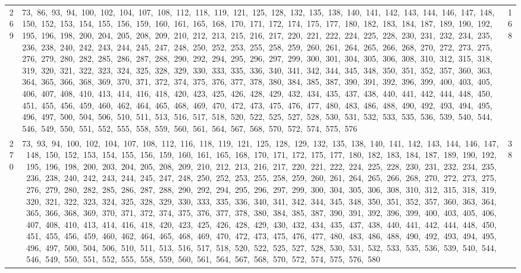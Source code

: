 \begin{longtable}{c|p{}|r}
269 & 73,\ 86,\ 93,\ 94,\ 100,\ 102,\ 104,\ 107,\ 108,\ 112,\ 118,\ 119,\ 121,\ 125,\ 128,\ 132,\ 135,\ 138,\ 140,\ 141,\ 142,\ 143,\ 144,\ 146,\ 147,\ 148,\ 150,\ 152,\ 153,\ 154,\ 155,\ 156,\ 159,\ 160,\ 161,\ 165,\ 168,\ 170,\ 171,\ 172,\ 174,\ 175,\ 177,\ 180,\ 182,\ 183,\ 184,\ 187,\ 189,\ 190,\ 192,\ 195,\ 196,\ 198,\ 200,\ 204,\ 205,\ 208,\ 209,\ 210,\ 212,\ 213,\ 215,\ 216,\ 217,\ 220,\ 221,\ 222,\ 224,\ 225,\ 228,\ 230,\ 231,\ 232,\ 234,\ 235,\ 236,\ 238,\ 240,\ 242,\ 243,\ 244,\ 245,\ 247,\ 248,\ 250,\ 252,\ 253,\ 255,\ 258,\ 259,\ 260,\ 261,\ 264,\ 265,\ 266,\ 268,\ 270,\ 272,\ 273,\ 275,\ 276,\ 279,\ 280,\ 282,\ 285,\ 286,\ 287,\ 288,\ 290,\ 292,\ 294,\ 295,\ 296,\ 297,\ 299,\ 300,\ 301,\ 304,\ 305,\ 306,\ 308,\ 310,\ 312,\ 315,\ 318,\ 319,\ 320,\ 321,\ 322,\ 323,\ 324,\ 325,\ 328,\ 329,\ 330,\ 333,\ 335,\ 336,\ 340,\ 341,\ 342,\ 344,\ 345,\ 348,\ 350,\ 351,\ 352,\ 357,\ 360,\ 363,\ 364,\ 365,\ 366,\ 368,\ 369,\ 370,\ 371,\ 372,\ 374,\ 375,\ 376,\ 377,\ 378,\ 380,\ 384,\ 385,\ 387,\ 390,\ 391,\ 392,\ 396,\ 399,\ 400,\ 403,\ 405,\ 406,\ 407,\ 408,\ 410,\ 413,\ 414,\ 416,\ 418,\ 420,\ 423,\ 425,\ 426,\ 428,\ 429,\ 432,\ 434,\ 435,\ 437,\ 438,\ 440,\ 441,\ 442,\ 444,\ 448,\ 450,\ 451,\ 455,\ 456,\ 459,\ 460,\ 462,\ 464,\ 465,\ 468,\ 469,\ 470,\ 472,\ 473,\ 475,\ 476,\ 477,\ 480,\ 483,\ 486,\ 488,\ 490,\ 492,\ 493,\ 494,\ 495,\ 496,\ 497,\ 500,\ 504,\ 506,\ 510,\ 511,\ 513,\ 516,\ 517,\ 518,\ 520,\ 522,\ 525,\ 527,\ 528,\ 530,\ 531,\ 532,\ 533,\ 535,\ 536,\ 539,\ 540,\ 544,\ 546,\ 549,\ 550,\ 551,\ 552,\ 555,\ 558,\ 559,\ 560,\ 561,\ 564,\ 567,\ 568,\ 570,\ 572,\ 574,\ 575,\ 576 & 168 \\
270 & 73,\ 93,\ 94,\ 100,\ 102,\ 104,\ 107,\ 108,\ 112,\ 116,\ 118,\ 119,\ 121,\ 125,\ 128,\ 129,\ 132,\ 135,\ 138,\ 140,\ 141,\ 142,\ 143,\ 144,\ 146,\ 147,\ 148,\ 150,\ 152,\ 153,\ 154,\ 155,\ 156,\ 159,\ 160,\ 161,\ 165,\ 168,\ 170,\ 171,\ 172,\ 175,\ 177,\ 180,\ 182,\ 183,\ 184,\ 187,\ 189,\ 190,\ 192,\ 195,\ 196,\ 198,\ 200,\ 203,\ 204,\ 205,\ 208,\ 209,\ 210,\ 212,\ 213,\ 216,\ 217,\ 220,\ 221,\ 222,\ 224,\ 225,\ 228,\ 230,\ 231,\ 232,\ 234,\ 235,\ 236,\ 238,\ 240,\ 242,\ 243,\ 244,\ 245,\ 247,\ 248,\ 250,\ 252,\ 253,\ 255,\ 258,\ 259,\ 260,\ 261,\ 264,\ 265,\ 266,\ 268,\ 270,\ 272,\ 273,\ 275,\ 276,\ 279,\ 280,\ 282,\ 285,\ 286,\ 287,\ 288,\ 290,\ 292,\ 294,\ 295,\ 296,\ 297,\ 299,\ 300,\ 304,\ 305,\ 306,\ 308,\ 310,\ 312,\ 315,\ 318,\ 319,\ 320,\ 321,\ 322,\ 323,\ 324,\ 325,\ 328,\ 329,\ 330,\ 333,\ 335,\ 336,\ 340,\ 341,\ 342,\ 344,\ 345,\ 348,\ 350,\ 351,\ 352,\ 357,\ 360,\ 363,\ 364,\ 365,\ 366,\ 368,\ 369,\ 370,\ 371,\ 372,\ 374,\ 375,\ 376,\ 377,\ 378,\ 380,\ 384,\ 385,\ 387,\ 390,\ 391,\ 392,\ 396,\ 399,\ 400,\ 403,\ 405,\ 406,\ 407,\ 408,\ 410,\ 413,\ 414,\ 416,\ 418,\ 420,\ 423,\ 425,\ 426,\ 428,\ 429,\ 430,\ 432,\ 434,\ 435,\ 437,\ 438,\ 440,\ 441,\ 442,\ 444,\ 448,\ 450,\ 451,\ 455,\ 456,\ 459,\ 460,\ 462,\ 464,\ 465,\ 468,\ 469,\ 470,\ 472,\ 473,\ 475,\ 476,\ 477,\ 480,\ 483,\ 486,\ 488,\ 490,\ 492,\ 493,\ 494,\ 495,\ 496,\ 497,\ 500,\ 504,\ 506,\ 510,\ 511,\ 513,\ 516,\ 517,\ 518,\ 520,\ 522,\ 525,\ 527,\ 528,\ 530,\ 531,\ 532,\ 533,\ 535,\ 536,\ 539,\ 540,\ 544,\ 546,\ 549,\ 550,\ 551,\ 552,\ 555,\ 558,\ 559,\ 560,\ 561,\ 564,\ 567,\ 568,\ 570,\ 572,\ 574,\ 575,\ 576,\ 580 & 38 \\

\end{longtable}
